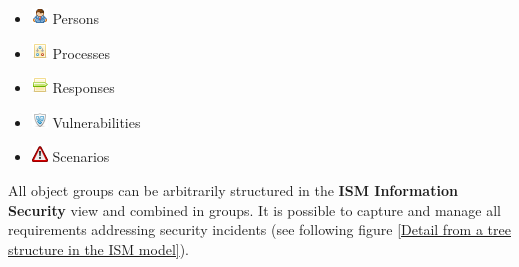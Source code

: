 \documentclass[a4paper,10pt]{book}
\begin{document}
\begin{itemize}
\item \includegraphics[height=2ex]{Icon/Mitarbeiter.png} Persons
\item \includegraphics[height=2ex]{Icon/Prozesse.png} Processes
\item \includegraphics[height=2ex]{Icon/Reaktionen.png} Responses
\item \includegraphics[height=2ex]{Icon/Schwachstellen.png} Vulnerabilities
\item \includegraphics[height=2ex]{Icon/Szenarios.png} Scenarios
\end{itemize}
All object groups can be arbitrarily structured in the \textbf{ISM Information Security} view and combined in groups.
It is possible to capture and manage all requirements addressing security incidents (see following figure \ref{Detail from a tree structure in the ISM model}).
\newline
\newline
\end{document}
